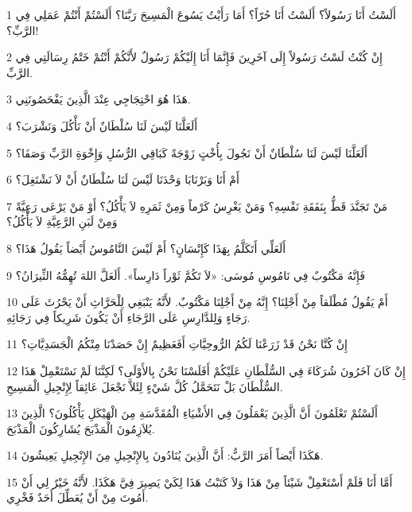 \par 1 أَلَسْتُ أَنَا رَسُولاً؟ أَلَسْتُ أَنَا حُرّاً؟ أَمَا رَأَيْتُ يَسُوعَ الْمَسِيحَ رَبَّنَا؟ أَلَسْتُمْ أَنْتُمْ عَمَلِي فِي الرَّبِّ؟!
\par 2 إِنْ كُنْتُ لَسْتُ رَسُولاً إِلَى آخَرِينَ فَإِنَّمَا أَنَا إِلَيْكُمْ رَسُولٌ لأَنَّكُمْ أَنْتُمْ خَتْمُ رِسَالَتِي فِي الرَّبِّ.
\par 3 هَذَا هُوَ احْتِجَاجِي عِنْدَ الَّذِينَ يَفْحَصُونَنِي.
\par 4 أَلَعَلَّنَا لَيْسَ لَنَا سُلْطَانٌ أَنْ نَأْكُلَ وَنَشْرَبَ؟
\par 5 أَلَعَلَّنَا لَيْسَ لَنَا سُلْطَانٌ أَنْ نَجُولَ بِأُخْتٍ زَوْجَةً كَبَاقِي الرُّسُلِ وَإِخْوَةِ الرَّبِّ وَصَفَا؟
\par 6 أَمْ أَنَا وَبَرْنَابَا وَحْدَنَا لَيْسَ لَنَا سُلْطَانٌ أَنْ لاَ نَشْتَغِلَ؟
\par 7 مَنْ تَجَنَّدَ قَطُّ بِنَفَقَةِ نَفْسِهِ؟ وَمَنْ يَغْرِسُ كَرْماً وَمِنْ ثَمَرِهِ لاَ يَأْكُلُ؟ أَوْ مَنْ يَرْعَى رَعِيَّةً وَمِنْ لَبَنِ الرَّعِيَّةِ لاَ يَأْكُلُ؟
\par 8 أَلَعَلِّي أَتَكَلَّمُ بِهَذَا كَإِنْسَانٍ؟ أَمْ لَيْسَ النَّامُوسُ أَيْضاً يَقُولُ هَذَا؟
\par 9 فَإِنَّهُ مَكْتُوبٌ فِي نَامُوسِ مُوسَى: «لاَ تَكُمَّ ثَوْراً دَارِساً». أَلَعَلَّ اللهَ تُهِمُّهُ الثِّيرَانُ؟
\par 10 أَمْ يَقُولُ مُطْلَقاً مِنْ أَجْلِنَا؟ إِنَّهُ مِنْ أَجْلِنَا مَكْتُوبٌ. لأَنَّهُ يَنْبَغِي لِلْحَرَّاثِ أَنْ يَحْرُثَ عَلَى رَجَاءٍ وَلِلدَّارِسِ عَلَى الرَّجَاءِ أَنْ يَكُونَ شَرِيكاً فِي رَجَائِهِ.
\par 11 إِنْ كُنَّا نَحْنُ قَدْ زَرَعْنَا لَكُمُ الرُّوحِيَّاتِ أَفَعَظِيمٌ إِنْ حَصَدْنَا مِنْكُمُ الْجَسَدِيَّاتِ؟
\par 12 إِنْ كَانَ آخَرُونَ شُرَكَاءَ فِي السُّلْطَانِ عَلَيْكُمْ أَفَلَسْنَا نَحْنُ بِالأَوْلَى؟ لَكِنَّنَا لَمْ نَسْتَعْمِلْ هَذَا السُّلْطَانَ بَلْ نَتَحَمَّلُ كُلَّ شَيْءٍ لِئَلاَّ نَجْعَلَ عَائِقاً لِإِنْجِيلِ الْمَسِيحِ.
\par 13 أَلَسْتُمْ تَعْلَمُونَ أَنَّ الَّذِينَ يَعْمَلُونَ فِي الأَشْيَاءِ الْمُقَدَّسَةِ مِنَ الْهَيْكَلِ يَأْكُلُونَ؟ الَّذِينَ يُلاَزِمُونَ الْمَذْبَحَ يُشَارِكُونَ الْمَذْبَحَ.
\par 14 هَكَذَا أَيْضاً أَمَرَ الرَّبُّ: أَنَّ الَّذِينَ يُنَادُونَ بِالإِنْجِيلِ مِنَ الإِنْجِيلِ يَعِيشُونَ.
\par 15 أَمَّا أَنَا فَلَمْ أَسْتَعْمِلْ شَيْئاً مِنْ هَذَا وَلاَ كَتَبْتُ هَذَا لِكَيْ يَصِيرَ فِيَّ هَكَذَا. لأَنَّهُ خَيْرٌ لِي أَنْ أَمُوتَ مِنْ أَنْ يُعَطِّلَ أَحَدٌ فَخْرِي.
